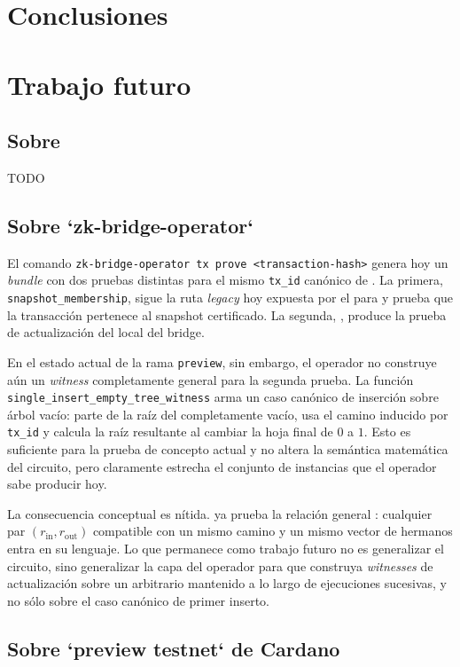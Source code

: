 
\section{Conclusiones}

\section{Trabajo futuro}

\subsection{Sobre }
TODO

\subsection{Sobre `zk-bridge-operator`}

El comando \texttt{zk-bridge-operator tx prove <transaction-hash>} genera hoy un \textit{bundle} con dos pruebas distintas para el mismo \texttt{tx\_id} canónico de \Cardano. La primera, \texttt{snapshot\_membership}, sigue la ruta \textit{legacy} hoy expuesta por el \MithrilAggregator para \CardanoTransactions y prueba que la transacción pertenece al snapshot certificado. La segunda, \TxSetUpdateCircuit, produce la prueba de actualización del \SMT local del bridge.

En el estado actual de la rama \texttt{preview}, sin embargo, el operador no construye aún un \textit{witness} completamente general para la segunda prueba. La función \texttt{single\_insert\_empty\_tree\_witness} arma un caso canónico de inserción sobre árbol vacío: parte de la raíz del \SMT completamente vacío, usa el camino inducido por \texttt{tx\_id} y calcula la raíz resultante al cambiar la hoja final de $0$ a $1$. Esto es suficiente para la prueba de concepto actual y no altera la semántica matemática del circuito, pero claramente estrecha el conjunto de instancias que el operador sabe producir hoy.

La consecuencia conceptual es nítida. \TxSetUpdateCircuit ya prueba la relación general \TxSetUpdateRelation: cualquier par $(r_{\mathrm{in}}, r_{\mathrm{out}})$ compatible con un mismo camino y un mismo vector de hermanos entra en su lenguaje. Lo que permanece como trabajo futuro no es generalizar el circuito, sino generalizar la capa \Offchain del operador para que construya \textit{witnesses} de actualización sobre un \SMT arbitrario mantenido a lo largo de ejecuciones sucesivas, y no sólo sobre el caso canónico de primer inserto.

\subsection{Sobre `preview testnet` de Cardano}
